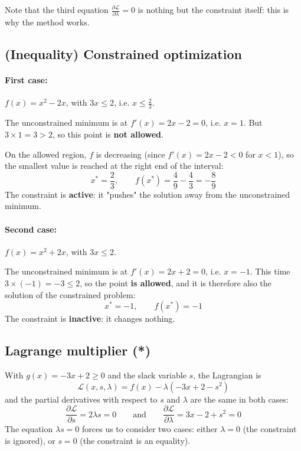 \documentclass[]{article}
\begin{document}
	Note that the third equation $\frac{\partial \mathcal{L}}{\partial \lambda} = 0$ is nothing but the constraint itself: this is why the method works.

	\subsection{(Inequality) Constrained optimization}

	\paragraph{First case:} $f(x) = x^2 - 2x$, with $3x \leq 2$, i.e. $x \leq \frac{2}{3}$.

	The unconstrained minimum is at $f'(x) = 2x - 2 = 0$, i.e. $x = 1$.
	But $3 \times 1 = 3 > 2$, so this point is \textbf{not allowed}.

	On the allowed region, $f$ is decreasing (since $f'(x) = 2x - 2 < 0$ for $x < 1$), so the smallest value is reached at the right end of the interval:
	$$
	x^* = \frac{2}{3},
	\qquad
	f(x^*) = \frac{4}{9} - \frac{4}{3} = -\frac{8}{9}
	$$
	The constraint is \textbf{active}: it "pushes" the solution away from the unconstrained minimum.

	\paragraph{Second case:} $f(x) = x^2 + 2x$, with $3x \leq 2$.

	The unconstrained minimum is at $f'(x) = 2x + 2 = 0$, i.e. $x = -1$.
	This time $3 \times (-1) = -3 \leq 2$, so the point \textbf{is allowed}, and it is therefore also the solution of the constrained problem:
	$$
	x^* = -1, \qquad f(x^*) = -1
	$$
	The constraint is \textbf{inactive}: it changes nothing.

	\subsection{Lagrange multiplier (*)}

	With $g(x) = -3x + 2 \geq 0$ and the slack variable $s$, the Lagrangian is
	$$
	\mathcal{L}(x,s,\lambda) = f(x) - \lambda\left(-3x + 2 - s^2\right)
	$$
	and the partial derivatives with respect to $s$ and $\lambda$ are the same in both cases:
	$$
	\frac{\partial \mathcal{L}}{\partial s} = 2\lambda s = 0
	\qquad \text{and} \qquad
	\frac{\partial \mathcal{L}}{\partial \lambda} = 3x - 2 + s^2 = 0
	$$
	The equation $\lambda s = 0$ forces us to consider two cases: either $\lambda = 0$ (the constraint is ignored), or $s = 0$ (the constraint is an equality).
\end{document}
